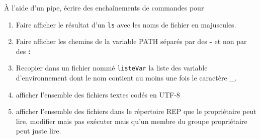 \documentclass[a4paper,11pt]{exam}
\begin{document}
{
	À l'aide d'un pipe, écrire des enchaînements de commandes pour 
	\begin{enumerate}	
	\item Faire afficher le résultat d'un \texttt{ls} avec les noms de fichier en majuscules.
	\item Faire afficher les chemins de la variable PATH séparés par des \textbf{-} et non par des \textbf{:}
	\item Recopier dans un fichier nommé \texttt{listeVar} la liste des variable d’environnement dont le nom contient au moins une fois le caractère \_.
	\item afficher l’ensemble des fichiers textes codés en UTF-8
	\item  afficher l’ensemble des fichiers dans le répertoire REP que le propriétaire peut lire, modifier mais pas exécuter mais qu’un membre du groupe propriétaire peut juste lire.
	\end{enumerate}
}
 
\end{document}
